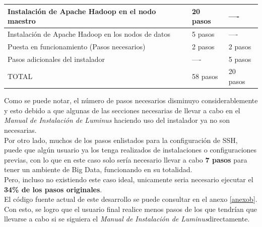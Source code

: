 \begin{table}[H]
\begin{tabular}{|l|l|l|}
Instalación de Apache Hadoop en el nodo maestro         & 20 pasos                                                                                  & ----                                                                           \\ \hline
Instalación de Apache Hadoop en los nodos de datos      & 5 pasos                                                                                   & ----                                                                           \\ \hline
Puesta en funcionamiento (Pasos necesarios)             & 2 pasos                                                                                   & 2 pasos                                                                        \\ \hline
Pasos adicionales del instalador                        & ----                                                                                      & 5 pasos                                                                        \\ \hline
TOTAL                                                   & 58 pasos                                                                                  & 20 pasos                                                                       \\ \hline
\end{tabular}
\end{table}
Como se puede notar, el número de pasos necesarios disminuyo considerablemente y esto debido a que algunas de las secciones necesarias de llevar a cabo en el \emph{Manual de Instalación de Luminus} haciendo uso del instalador ya no son necesarias.
\\
Por otro lado, muchos de los pasos enlistados para la configuración de SSH, puede que algún usuario ya los tenga realizados de instalaciones o configuraciones previas, con lo que en este caso solo sería necesario llevar a cabo \textbf{7 pasos} para tener un ambiente de Big Data, funcionando en su totalidad.\\
Pero, incluso no existiendo este caso ideal, unicamente seria necesario ejecutar el \textbf{34\% de los pasos originales}. 
\\
El código fuente actual de este desarrollo se puede consultar en el anexo \ref{anexob}.
\\
Con esto, se logro que el usuario final realice menos pasos de los que tendrían que llevarse a cabo si se siguiera el \emph{Manual de Instalación de Luminus}directamente. 
\\

